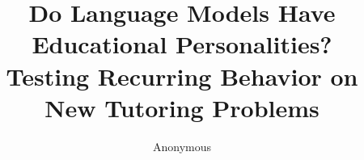 \documentclass[11pt]{article}
\title{Do Language Models Have Educational Personalities?\\
Testing Recurring Behavior on New Tutoring Problems}
\author{Anonymous}
\date{}
\begin{document}
\maketitle









\FloatBarrier

\clearpage
\appendix





\end{document}

